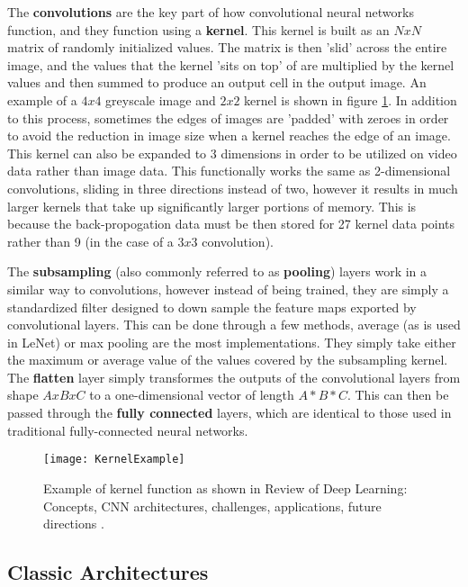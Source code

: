 The \textbf{convolutions} are the key part of how convolutional neural networks function, and they function using a \textbf{kernel}. This kernel is built as an $NxN$ matrix of randomly initialized values. The matrix is then 'slid' across the entire image, and the values that the kernel 'sits on top' of are multiplied by the kernel values and then summed to produce an output cell in the output image. An example of a $4x4$ greyscale image and $2x2$ kernel is shown in figure \ref{fig:kernel-example}. In addition to this process, sometimes the edges of images are 'padded' with zeroes in order to avoid the reduction in image size when a kernel reaches the edge of an image. This kernel can also be expanded to 3 dimensions in order to be utilized on video data rather than image data. This functionally works the same as 2-dimensional convolutions, sliding in three directions instead of two, however it results in much larger kernels that take up significantly larger portions of memory. This is because the back-propogation data must be then stored for 27 kernel data points rather than 9 (in the case of a $3x3$ convolution).

The \textbf{subsampling} (also commonly referred to as \textbf{pooling}) layers work in a similar way to convolutions, however instead of being trained, they are simply a standardized filter designed to down sample the feature maps exported by convolutional layers. This can be done through a few methods, average (as is used in LeNet) or max pooling are the most implementations. They simply take either the maximum or average value of the values covered by the subsampling kernel. The \textbf{flatten} layer simply transformes the outputs of the convolutional layers from shape $AxBxC$ to a one-dimensional vector of length $A*B*C$. This can then be passed through the \textbf{fully connected} layers, which are identical to those used in traditional fully-connected neural networks.

\begin{figure}[ht]
	\texttt{[image: KernelExample]}
	\centering
	\caption{Example of kernel function as shown in Review of Deep Learning: Concepts, CNN architectures, challenges, applications, future directions \cite{2021cnnreview}.}
	\label{fig:kernel-example}
\end{figure}

\subsection{Classic Architectures}
\label{sec:classic-cnn}

